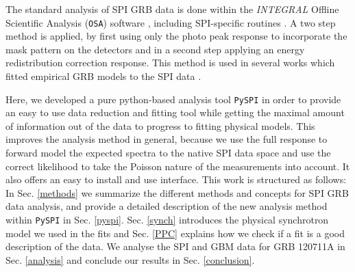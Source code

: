 \documentclass[twocolumn,traditabstract]{aa}
\begin{document}
The standard analysis of SPI GRB data is done within the \textit{INTEGRAL} Offline Scientific Analysis ({\tt OSA}) software \citep{osa}, including SPI-specific routines \citep{Diehl-2003}. A two step method is applied, by first using only the photo peak response to incorporate the mask pattern on the detectors and in a second step applying an energy redistribution correction response. This method is used in several works which fitted empirical GRB models to the SPI data \citep{Malaguti-2003, Mereghetti-2003, Mereghetti-2003.2, Kienlin-2003, Kienlin-2003.2,Beckmann-2004, Moran-2005, Filliatre-2005.1, Filliatre-2005.2, McBreen-2006, Grebenev-2007, McGlynn-2008, Foley-2008, McGlynn-2009, Martin-Carrillo-2014}.


Here, we developed a pure python-based analysis tool {\tt PySPI} in order to provide an easy to use data reduction and fitting tool while getting the maximal amount of information out of the data to progress to fitting physical models. This improves the analysis method in general, because we use the full response to forward model the expected spectra to the native SPI data space and use the correct likelihood to take the Poisson nature of the measurements into account. It also offers an easy to install and use interface.
This work is structured as follows: In Sec. \ref{methods} we summarize the different methods and concepts for SPI GRB data analysis, and provide a detailed description of the new analysis method within {\tt PySPI} in Sec. \ref{pyspi}. Sec. \ref{synch} introduces the physical synchrotron model we used in the fits and Sec. \ref{PPC} explains how we check if a fit is a good description of the data. We analyse the SPI and GBM data for GRB 120711A in Sec. \ref{analysis} and conclude our results in Sec. \ref{conclusion}.
\end{document}
